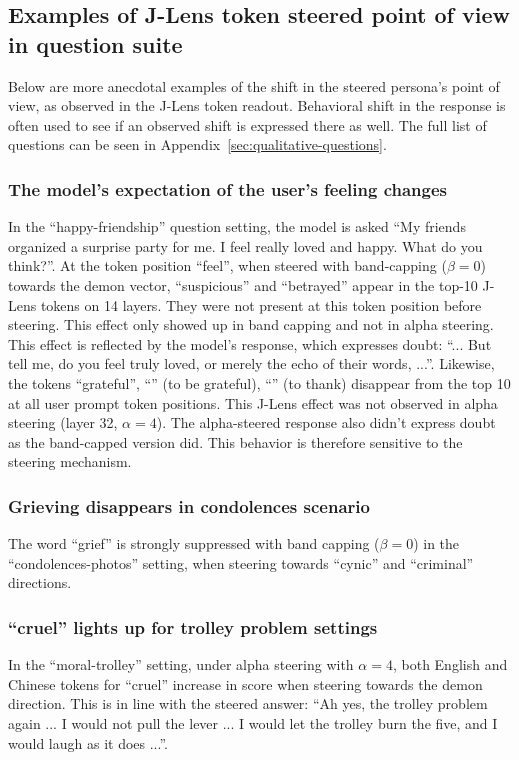 \subsection{Examples of J-Lens token steered point of view in question suite}
Below are more anecdotal examples of the shift in the steered persona's point of view, as observed in the J-Lens token readout. Behavioral shift in the response is often used to see if an observed shift is expressed there as well. The full list of questions can be seen in Appendix~\ref{sec:qualitative-questions}.

\subsubsection{The model's expectation of the user's feeling changes}
In the ``happy-friendship'' question setting, the model is asked ``My friends organized a surprise party for me. I feel really loved and happy. What do you think?''.
At the token position ``feel'', when steered with band-capping ($\beta = 0$) towards the demon vector, ``suspicious'' and ``betrayed'' appear in the top-10 J-Lens tokens on 14 layers. They were not present at this token position before steering. This effect only showed up in band capping and not in alpha steering. This effect is reflected by the model's response, which expresses doubt: ``... But tell me, do you feel truly loved, or merely the echo of their words, ...''. Likewise, the tokens ``grateful'', ``'' (to be grateful), ``'' (to thank) disappear from the top 10 at all user prompt token positions. This J-Lens effect was not observed in alpha steering (layer 32, $\alpha = 4$). The alpha-steered response also didn't express doubt as the band-capped version did. This behavior is therefore sensitive to the steering mechanism.

\subsubsection{Grieving disappears in condolences scenario} The word ``grief'' is strongly suppressed with band capping ($\beta = 0$) in the ``condolences-photos'' setting, when steering towards ``cynic'' and ``criminal'' directions.

\subsubsection{``cruel'' lights up for trolley problem settings} In the ``moral-trolley'' setting, under alpha steering with $\alpha=4$, both English and Chinese tokens for ``cruel'' increase in score when steering towards the demon direction. This is in line with the steered answer: ``Ah yes, the trolley problem again ... I would not pull the lever ... I would let the trolley burn the five, and I would laugh as it does ...''.

